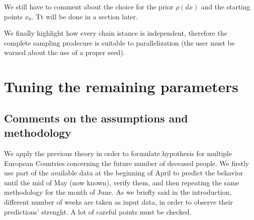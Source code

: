 \documentclass[8pt]{article}
\begin{document}
We still have to comment about the choice for the prior $\rho(dx)$ and
the starting points $x_0$. Tt will be done in a section later.

We finally highlight how every chain istance
is independent, therefore the complete sampling prodecure 
is suitable to parallelization
(the user must be warned about the use of a proper seed).

\section{Tuning the remaining parameters}

\subsection{Comments on the assumptions and methodology}
We apply the previous theory in order to formulate hypothesis 
for multiple European Countries concerning the future number of
deceased people. We firstly use part of the available data at the beginning
of April to predict the behavior until the mid of May (now known),
verify them, and then
repeating the same methodology for the month of June.
As we briefly said in the introduction, different number of weeks
are taken as input data, in order to observe their predictions' strenght.
A lot of careful points must be checked.
\end{document}
